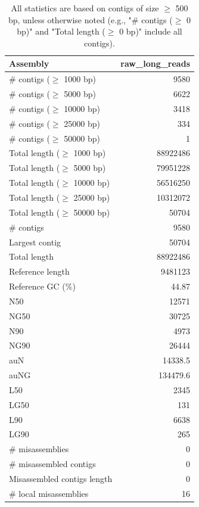 \documentclass[12pt,a4paper]{article}
\begin{document}
\begin{table}[ht]
\begin{center}
\caption{All statistics are based on contigs of size $\geq$ 500 bp, unless otherwise noted (e.g., "\# contigs ($\geq$ 0 bp)" and "Total length ($\geq$ 0 bp)" include all contigs).}
\begin{tabular}{|l*{1}{|r}|}
\hline
Assembly & raw\_long\_reads \\ \hline
\# contigs ($\geq$ 1000 bp) & 9580 \\ \hline
\# contigs ($\geq$ 5000 bp) & 6622 \\ \hline
\# contigs ($\geq$ 10000 bp) & 3418 \\ \hline
\# contigs ($\geq$ 25000 bp) & 334 \\ \hline
\# contigs ($\geq$ 50000 bp) & 1 \\ \hline
Total length ($\geq$ 1000 bp) & 88922486 \\ \hline
Total length ($\geq$ 5000 bp) & 79951228 \\ \hline
Total length ($\geq$ 10000 bp) & 56516250 \\ \hline
Total length ($\geq$ 25000 bp) & 10312072 \\ \hline
Total length ($\geq$ 50000 bp) & 50704 \\ \hline
\# contigs & 9580 \\ \hline
Largest contig & 50704 \\ \hline
Total length & 88922486 \\ \hline
Reference length & 9481123 \\ \hline
Reference GC (\%) & 44.87 \\ \hline
N50 & 12571 \\ \hline
NG50 & 30725 \\ \hline
N90 & 4973 \\ \hline
NG90 & 26444 \\ \hline
auN & 14338.5 \\ \hline
auNG & 134479.6 \\ \hline
L50 & 2345 \\ \hline
LG50 & 131 \\ \hline
L90 & 6638 \\ \hline
LG90 & 265 \\ \hline
\# misassemblies & 0 \\ \hline
\# misassembled contigs & 0 \\ \hline
Misassembled contigs length & 0 \\ \hline
\# local misassemblies & 16 \\ \hline

\end{tabular}
\end{center}
\end{table}
\end{document}
